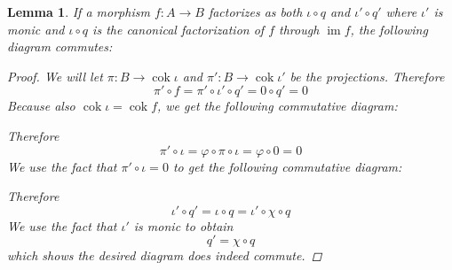 \documentclass{article}
\DeclareMathOperator{\im}{im}
\DeclareMathOperator{\cok}{cok}
\newtheorem{lemma}[theorem]{Lemma}
\begin{document}
\begin{lemma}\label{lem:double factorization through im}
    If a morphism $f:A\to B$ factorizes as both $\iota \circ q$ and $\iota'\circ q'$ where $\iota'$ is monic and $\iota \circ q$ is the canonical factorization of $f$ through $\im f$, the following diagram commutes:
    \begin{center}
    \end{center}
    \cite{FIT}
    \begin{proof}
        We will let $\pi:B\to \cok \iota$ and $\pi':B\to \cok \iota'$ be the projections. Therefore
        \[
        \pi'\circ f=\pi'\circ \iota'\circ q'=0\circ q'=0
        \]
        Because also $\cok \iota=\cok f$, we get the following commutative diagram:
        \begin{center}
        \end{center}
        Therefore
        \[
        \pi'\circ \iota =\varphi \circ \pi \circ \iota=\varphi \circ 0=0
        \]
        We use the fact that $\pi'\circ \iota=0$ to get the following commutative diagram:
        \begin{center}
        \end{center}
         Therefore
        \[
        \iota'\circ q'=\iota \circ q=\iota' \circ \chi \circ q
        \]
        We use the fact that $\iota'$ is monic to obtain
        \[
        q'=\chi \circ q
        \]
        which shows the desired diagram does indeed commute.
    \end{proof}
\end{lemma}
\end{document}
